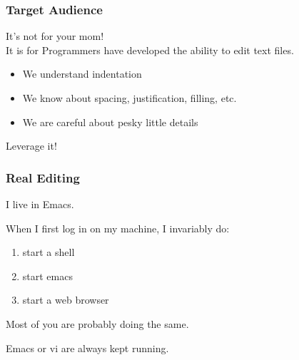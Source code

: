 \documentclass[compress,trans]{beamer}
\begin{document}
\begin{frame}[fragile]
  \frametitle{Target Audience}
 
 It's not for your mom!   \\
 It is for Programmers have developed the ability to edit text files.
 
 \begin{itemize}
 \item We understand indentation
 \item We know about spacing, justification, filling, etc.
 \item We are careful about pesky little details
 \end{itemize}
 
 Leverage it!
 
\end{frame}

 
\begin{frame}[fragile]
  \frametitle{Real Editing}

I live in Emacs.

When I first log in on my machine, I invariably do:
\begin{enumerate}
\item start a shell
\item start emacs
\item start a web browser
\end{enumerate}

Most of you are probably doing the same.

Emacs or vi are always kept running.
 
\end{frame}
 






% 
% 
% 
% 
% 
% 
% 
% 
% 
% 
% 
% 
% 
% 
% 
% 
% 
% 
\end{document}
